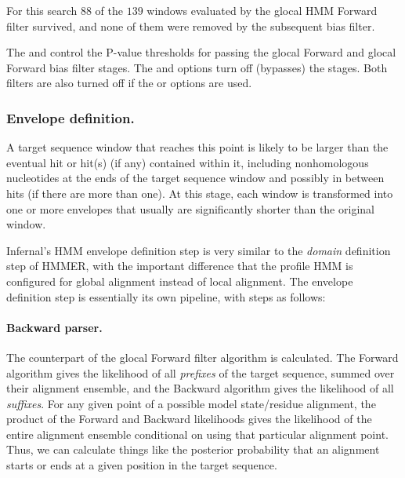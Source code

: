 For this search $88$ of the $139$ windows evaluated by the glocal HMM
Forward filter survived, and none of them were removed by the subsequent bias filter. 

The  and  control the P-value thresholds for
passing the glocal Forward and glocal Forward bias filter stages.  The
 and  options turn off (bypasses) the
stages. Both filters are also turned off if the  or
 options are used.

\subsubsection{Envelope definition.}

A target sequence window that reaches this point is likely to be
larger than the eventual hit or hit(s) (if any) contained within it,
including nonhomologous nucleotides at the ends of the target sequence
window and possibly in between hits (if there are more than one). At
this stage, each window is transformed into one or more envelopes that
usually are significantly shorter than the original window. 


Infernal's HMM envelope definition step is very similar to the
\emph{domain} definition step of HMMER, with the important difference
that the profile HMM is configured for global alignment instead of
local alignment.  The envelope definition step is essentially its own
pipeline, with steps as follows:

\paragraph{Backward parser.}
The counterpart of the glocal Forward filter algorithm is calculated.
The Forward algorithm gives the likelihood of all \emph{prefixes} of
the target sequence, summed over their alignment ensemble, and the
Backward algorithm gives the likelihood of all \emph{suffixes}. For
any given point of a possible model state/residue alignment, the
product of the Forward and Backward likelihoods gives the likelihood
of the entire alignment ensemble conditional on using that particular
alignment point. Thus, we can calculate things like the posterior
probability that an alignment starts or ends at a given position in
the target sequence.

